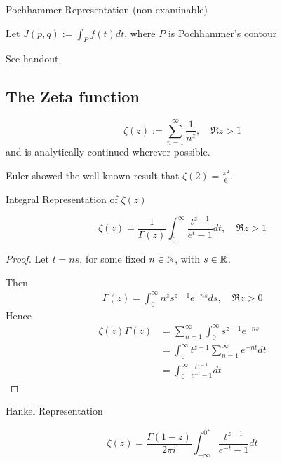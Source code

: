 \documentclass[a4paper]{article}
\begin{document}
\begin{prop} Pochhammer Representation (non-examinable)

	Let $J(p,q) := \int_{P} f(t) dt$, where  $P$ is Pochhammer's contour

\begin{figure}[H]
    \centering
\end{figure}

See handout.
\end{prop}

\subsection{The Zeta function}

\begin{defn}
	\[
		\zeta(z) := \sum_{n=1}^{\infty}\frac{1}{n^{z}}, \quad \Re z > 1
	\]
	and is analytically continued wherever possible.
\end{defn}

Euler showed the well known result that $\zeta(2) = \frac{\pi^2}{6}$.

\begin{prop} Integral Representation of $\zeta(z)$

	\[
		\zeta(z) = \frac{1}{\Gamma(z)} \int_{0}^{\infty} \frac{t^{z-1}}{e^{t} - 1} dt, \quad \Re z > 1
	\] 
\end{prop}

\begin{proof}
	Let $t = ns$, for some fixed $n \in \mathbb{N}$, with $s \in \mathbb{R}$.

	Then
	\begin{align*}
		\Gamma(z) = \int_{0}^{\infty} n^{z} s^{z-1} e^{-ns} ds, \quad \Re z > 0 
	\end{align*}
	Hence 
	\begin{align*}
		\zeta(z) \Gamma(z) &= \sum_{n=1}^{\infty} \int_0^{\infty} s^{z-1} e^{-ns} \\
		&= \int_0^{\infty} t^{z-1} \sum_{n=1}^{\infty} e^{-nt} dt \\
		&= \int_0^{\infty} \frac{t^{z-1}}{e^{-t} -1} dt
	\end{align*}
\end{proof}

\begin{prop} Hankel Representation 

	\[
		\zeta(z) = \frac{\Gamma(1-z)}{2\pi i} \int_{-\infty}^{0^{+}} \frac{t^{z-1}}{e^{-t} - 1} dt
	\] 
\end{prop}
\end{document}
